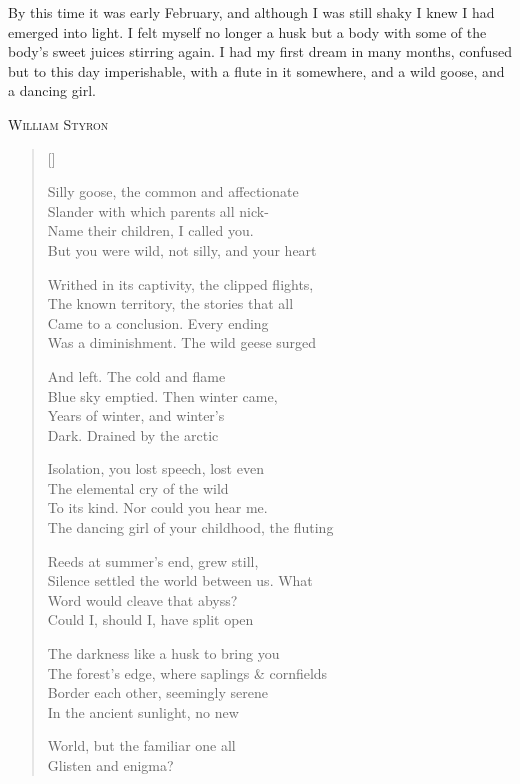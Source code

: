 \label{ch:darknessvisible}
\begingroup
\setlength\epigraphwidth{9cm}
\epigraph{By this time it was early February, and although I was still shaky I knew I had emerged into light. I felt myself no longer a husk but a body with some of the body's sweet juices stirring again. I had my first dream in many months, confused but to this day imperishable, with a flute in it somewhere, and a wild goose, and a dancing girl.}{\textsc{William Styron}}
\endgroup

\settowidth{\versewidth}{The forest's edge, where saplings \& cornfields}
\begin{verse}[\versewidth]

Silly goose, the common and affectionate\\
Slander with which parents all nick-\\
Name their children, I called you.\\
But you were wild, not silly, and your heart

Writhed in its captivity, the clipped flights,\\
The known territory, the stories that all\\
Came to a conclusion. Every ending\\
Was a diminishment. The wild geese surged

And left. The cold and flame\\
Blue sky emptied.  Then winter came,\\
Years of winter, and winter's\\
Dark. Drained by the arctic

Isolation, you lost speech, lost even\\
The elemental cry of the wild\\
To its kind. Nor could you hear me.\\
The dancing girl of your childhood, the fluting

Reeds at summer's end, grew still,\\
Silence settled the world between us. What\\
Word would cleave that abyss?\\
Could I, should I, have split open

The darkness like a husk to bring you\\
The forest's edge, where saplings \& cornfields\\
Border each other, seemingly serene\\
In the ancient sunlight, no new

World, but the familiar one all\\
Glisten and enigma?
\end{verse}
